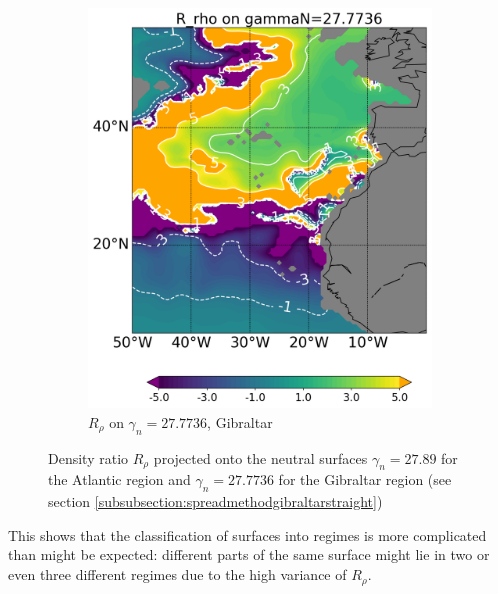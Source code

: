 \begin{figure}[htbp]
\begin{subfigure}[b]{0.4\textwidth}
         \includegraphics[width=\textwidth]{plots/R_rho/gibraltar_r_rho/Map2dcyl_R_rho_on_gammaN_2777e-2_reg310Eto360E05Nto57N_1990to1998av_WOCE.png}
         \caption{$R_\rho$ on $\gamma_n = 27.7736$, Gibraltar}
         \label{fig:subplot_gibraltar_r_rho}
     \end{subfigure}
     
    \caption{Density ratio $R_\rho$ projected onto the neutral surfaces $\gamma_n= 27.89$ for the Atlantic region and  $\gamma_n = 27.7736$ for the Gibraltar region (see section \ref{subsubsection:spreadmethodgibraltarstraight})}
    \label{fig:R_rho}
    
\end{figure}

This shows that the classification of surfaces into regimes is more complicated than might be expected: different parts of the same surface might lie in two or even three different regimes due to the high variance of $R_\rho$.